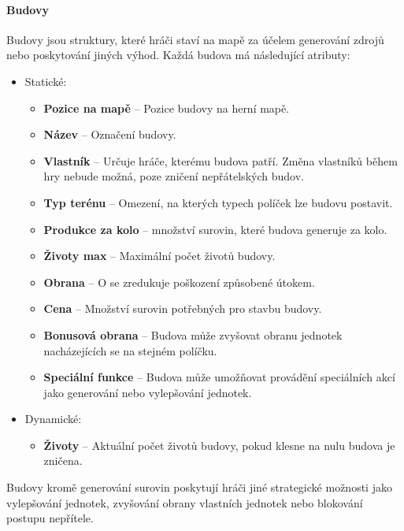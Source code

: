 \paragraph{Budovy}
Budovy jsou struktury, které hráči staví na mapě za účelem generování zdrojů nebo poskytování jiných výhod. Každá budova má následující atributy:
\begin{itemize}
    \item Statické:
    \begin{itemize}
        \item \textbf{Pozice na mapě} -- Pozice budovy na herní mapě.
        \item \textbf{Název} -- Označení budovy.
        \item \textbf{Vlastník} -- Určuje hráče, kterému budova patří. Změna vlastníků během hry nebude možná, poze zničení nepřátelských budov.
        \item \textbf{Typ terénu} -- Omezení, na kterých typech políček lze budovu postavit.
        \item \textbf{Produkce za kolo} – množství surovin, které budova generuje za kolo.
        \item \textbf{Životy max} -- Maximální počet životů budovy.
        \item \textbf{Obrana} -- O se zredukuje poškození způsobené útokem.
        \item \textbf{Cena} -- Množství surovin potřebných pro stavbu budovy.
        \item \textbf{Bonusová obrana} -- Budova může zvyšovat obranu jednotek nacházejících se na stejném políčku.
        \item \textbf{Speciální funkce} -- Budova může umožňovat provádění speciálních akcí jako generování nebo vylepšování jednotek.
    \end{itemize}
    \item Dynamické:
    \begin{itemize}
        \item \textbf{Životy} -- Aktuální počet životů budovy, pokud klesne na nulu budova je zničena.
    \end{itemize}
\end{itemize}
Budovy kromě generování surovin poskytují hráči jiné strategické možnosti jako vylepšování jednotek, zvyšování obrany vlastních jednotek nebo blokování postupu nepřítele.

